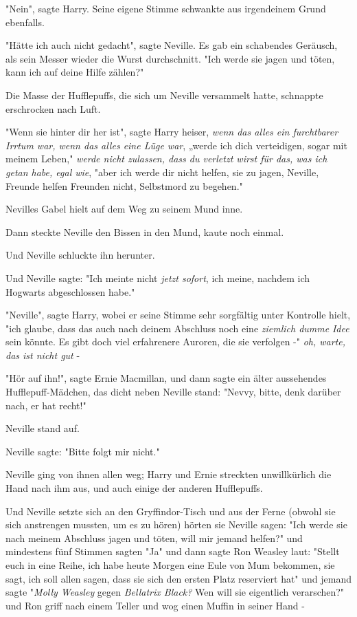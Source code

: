 {"Nein", sagte Harry. Seine eigene Stimme schwankte aus irgendeinem Grund ebenfalls.

"Hätte ich auch nicht gedacht", sagte Neville. Es gab ein schabendes Geräusch, als sein Messer wieder die Wurst durchschnitt. "Ich werde sie jagen und töten, kann ich auf deine Hilfe zählen?"

Die Masse der Hufflepuffs, die sich um Neville versammelt hatte, schnappte erschrocken nach Luft.

"Wenn sie hinter dir her ist", sagte Harry heiser, \emph{wenn das alles ein furchtbarer Irrtum war, wenn das alles eine Lüge war}, „werde ich dich verteidigen, sogar mit meinem Leben," \emph{werde nicht zulassen, dass du verletzt wirst für das, was ich getan habe, egal wie}, "aber ich werde dir nicht helfen, sie zu jagen, Neville, Freunde helfen Freunden nicht, Selbstmord zu begehen."

Nevilles Gabel hielt auf dem Weg zu seinem Mund inne.

Dann steckte Neville den Bissen in den Mund, kaute noch einmal.

Und Neville schluckte ihn herunter.

Und Neville sagte: "Ich meinte nicht \emph{jetzt sofort}, ich meine, nachdem ich Hogwarts abgeschlossen habe."

"Neville", sagte Harry, wobei er seine Stimme sehr sorgfältig unter Kontrolle hielt, "ich glaube, dass das auch nach deinem Abschluss noch eine \emph{ziemlich dumme} \emph{Idee} sein könnte. Es gibt doch viel erfahrenere Auroren, die sie verfolgen -" \emph{oh, warte, das ist nicht gut} -

"Hör auf ihn!", sagte Ernie Macmillan, und dann sagte ein älter aussehendes Hufflepuff-Mädchen, das dicht neben Neville stand: "Nevvy, bitte, denk darüber nach, er hat recht!"

Neville stand auf.

Neville sagte: "Bitte folgt mir nicht."

Neville ging von ihnen allen weg; Harry und Ernie streckten unwillkürlich die Hand nach ihm aus, und auch einige der anderen Hufflepuffs.

Und Neville setzte sich an den Gryffindor-Tisch und aus der Ferne (obwohl sie sich anstrengen mussten, um es zu hören) hörten sie Neville sagen: "Ich werde sie nach meinem Abschluss jagen und töten, will mir jemand helfen?" und mindestens fünf Stimmen sagten "Ja" und dann sagte Ron Weasley laut: "Stellt euch in eine Reihe, ich habe heute Morgen eine Eule von Mum bekommen, sie sagt, ich soll allen sagen, dass sie sich den ersten Platz reserviert hat" und jemand sagte "\emph{Molly Weasley} gegen \emph{Bellatrix Black?} Wen will sie eigentlich verarschen?" und Ron griff nach einem Teller und wog einen Muffin in seiner Hand -

}

